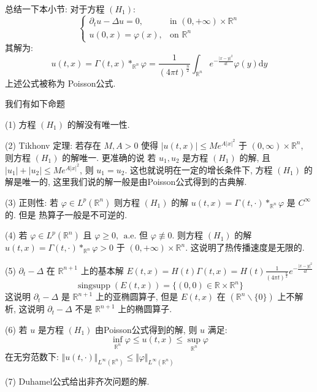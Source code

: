 \documentclass[11pt]{ctexart}[UTF8]
\begin{document}
总结一下本小节:
对于方程 $(H_{1})$:
\begin{equation*}
    \begin{cases}
    \partial_{t} u - \Delta u = 0, & \text{in } (0,+\infty)\times\mathbb{R}^n\\
    u(0,x) = \varphi(x), & \text{on }  \mathbb{R}^n
    \end{cases}
\end{equation*}
其解为:
\begin{equation*}
    u(t,x) = \Gamma(t,x) \ast_{\mathbb{R}^{n}} \varphi = \frac{1}{(4\pi t)^{\frac{n}{2}}}\int_{\mathbb{R}^n} e^{-\frac{|x-y|^2}{4t}} \varphi(y) \mathrm{d}y
\end{equation*}
上述公式被称为 Poisson公式.\par
我们有如下命题
\begin{proposition}\leavevmode
    (1) 方程 $(H_1)$ 的解没有唯一性.\par
    (2) Tikhonv 定理: 若存在 $M,A >0$ 使得 $|u(t,x)| \leq M e^{A|x|^2}$ 于 $(0,\infty)\times \mathbb{R}^n$, 则方程 $(H_1)$ 的解唯一. 更准确的说
    若 $u_{1},u_{2}$ 是方程 $(H_{1})$ 的解, 且 $|u_{1}|+|u_{2}| \leq M e^{A|x|^2}$, 则 $u_1 = u_2$. 这也就说明在一定的增长条件下, 方程
    $(H_{1})$ 的解是唯一的, 这里我们说的解一般是由Poisson公式得到的古典解.\par
    (3) 正则性: 若 $\varphi \in L^{p}(\mathbb{R}^{n})$ 则方程 $(H_{1})$ 的解 $u(t,x) = \Gamma(t,\cdot) \ast_{\mathbb{R}^{n}} \varphi$ 是 $C^{\infty}$ 的. 但是
    热算子一般是不可逆的.\par
    (4) 若 $\varphi \in L^{p}(\mathbb{R}^{n})$ 且 $\varphi \geq 0,\ \ \mathrm{a.e.}$ 但 $\varphi \not\equiv 0$. 
    则方程 $(H_{1})$ 的解 $u(t,x) = \Gamma(t,\cdot) \ast_{\mathbb{R}^{n}} \varphi > 0$ 于 $(0,+\infty)\times\mathbb{R}^n$. 这说明了热传播速度是无限的.\par
    (5) $\partial_{t}-\Delta$ 在 $\mathbb{R}^{n+1}$ 上的基本解 $E(t,x) = H(t)\Gamma(t,x) =H(t) \frac{1}{(4\pi t)^{\frac{n}{2}}}e^{-\frac{|x-y|^2}{4t}}$
    \begin{equation*}
        \operatorname{singsupp}(E(t,x)) = \{ (0,0) \in \mathbb{R}\times\mathbb{R}^{n} \}
    \end{equation*}
    这说明 $\partial_{t}-\Delta$ 是 $\mathbb{R}^{n+1}$ 上的亚椭圆算子, 但是 $E(t,x)$ 在
    $ (\mathbb{R}^{n}\backslash\{0\})$ 上不解析, 这说明 $\partial_{t}-\Delta$ 不是 $\mathbb{R}^{n+1}$ 上的椭圆算子.\par
    (6) 若 $u$ 是方程 $(H_{1})$ 由Poisson公式得到的解, 则 $u$ 满足:
    \begin{equation*}
        \operatorname{inf}\limits_{\mathbb{R}^{n}} \varphi \leq u(t,x) \leq \operatorname{sup}\limits_{\mathbb{R}^{n}} \varphi
    \end{equation*}
    在无穷范数下: $\Vert u(t,\cdot) \Vert_{L^\infty(\mathbb{R}^n)} \leq \Vert \varphi \Vert_{L^\infty(\mathbb{R}^n)}$\par
    (7) Duhamel公式给出非齐次问题的解.
\end{proposition}
\end{document}
